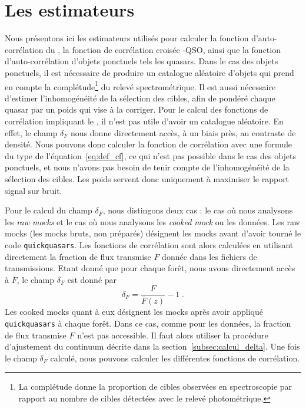 \section{Les estimateurs}
\label{sec:estimateurs}
Nous présentons ici les estimateurs utilisés pour calculer la fonction d'auto-corrélation du \lya{}, la fonction de corrélation croisée \lya{}-QSO, ainsi que la fonction d'auto-corrélation d'objets ponctuels tels les quasars.
  Dans le cas des objets ponctuels, il est nécessaire de produire un catalogue aléatoire d'objets qui prend en compte la complétude\footnote{La complétude donne la proportion de cibles observées en spectroscopie par rapport au nombre de cibles détectées avec le relevé photométrique.} du relevé spectrométrique. %
  Il est aussi nécessaire d'estimer l'inhomogénéité de la sélection des cibles, afin de pondéré chaque quasar par un poids qui vise à la corriger.
Pour le calcul des fonctions de corrélation impliquant le \lya{}, il n'est pas utile d'avoir un catalogue aléatoire. En effet, le champ $\delta_F$ nous donne directement accès, à un biais près, au contraste de densité. Nous pouvons donc calculer la fonction de corrélation avec une formule du type de l'équation~\ref{eq:def_cf}, ce qui n'est pas possible dans le cas des objets ponctuels, et nous n'avons pas besoin de tenir compte de l'inhomogénéité de la sélection des cibles. Les poids servent donc uniquement à maximiser le rapport signal sur bruit.

Pour le calcul du champ $\delta_F$, nous distingons deux cas : le cas où nous analysons les \emph{raw mocks} et le cas où nous analysons les \emph{cooked mock} ou les données.
Les raw mocks (les mocks bruts, non préparés) désignent les mocks avant d'avoir tourné le code \texttt{quickquasars}.
Les fonctions de corrélation sont alors calculées en utilisant directement la fraction de flux transmise $F$ donnée dans les fichiers de transmissions. Etant donné que pour chaque forêt, nous avons directement accès à $F$, le champ $\delta_F$ est donné par
\begin{equation}
  \delta_F = \frac{F}{\overline F(z)} - 1 \; .
\end{equation}
Les cooked mocks quant à eux désignent les mocks après avoir appliqué \texttt{quickquasars} à chaque forêt. Dans ce cas, comme pour les données, la fraction de flux transmise $F$ n'est pas accessible. Il faut alors utiliser la procédure d'ajustement du continuum décrite dans la section~\ref{subsec:calcul_delta}.
Une fois le champ $\delta_F$ calculé, nous pouvons calculer les différentes fonctions de corrélation.

